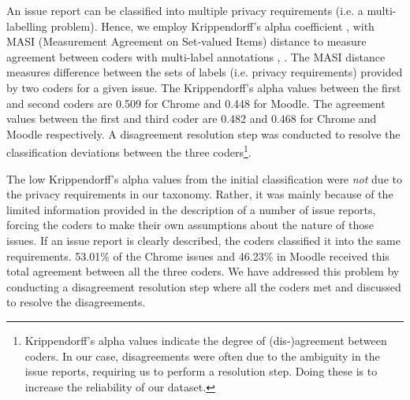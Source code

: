 An issue report can be classified into multiple privacy requirements (i.e. a multi-labelling problem). Hence, we employ Krippendorff's alpha coefficient \cite{Krippendorff2011}, \cite{Artstein2008} with MASI (Measurement Agreement on Set-valued Items) distance to measure agreement between coders with multi-label annotations \cite{Ravenscroft2016}, \cite{Passonneau2006}. The MASI distance measures difference between the sets of labels (i.e. privacy requirements) provided by two coders for a given issue. The Krippendorff's alpha values between the first and second coders are 0.509 for Chrome and 0.448 for Moodle. The agreement values between the first and third coder are 0.482 and 0.468 for Chrome and Moodle respectively. A disagreement resolution step was conducted to resolve the classification deviations between the three coders\footnote{Krippendorff’s alpha values indicate the degree of (dis-)agreement between coders. In our case, disagreements were often due to the ambiguity in the issue reports, requiring us to perform a resolution step. Doing these is to increase the reliability of our dataset.}.

The low Krippendorff's alpha values from the initial classification were \emph{not} due to the privacy requirements in our taxonomy. Rather, it was mainly because of the limited information provided in the description of a number of issue reports, forcing the coders to make their own assumptions about the nature of those issues. If an issue report is clearly described, the coders classified it into the same requirements. 53.01\% of the Chrome issues and 46.23\% in Moodle received this total agreement between all the three coders. We have addressed this problem by conducting a disagreement resolution step where all the coders met and discussed to resolve the disagreements. 


